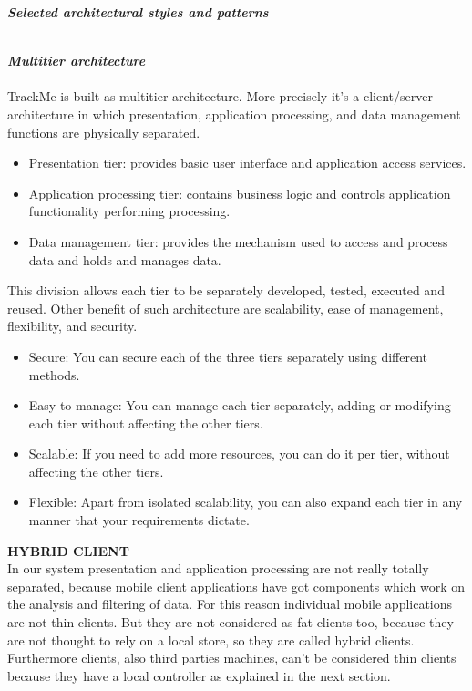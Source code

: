 \begin{legal}
\begin{legal}
				\end{legal}
		\item \textit{\textbf{Selected architectural styles and patterns}}\\\\
			\begin{legal}
				\item \textit{\textbf{Multitier architecture}}\\\\
				TrackMe is built as multitier architecture. More precisely it's a client/server architecture in which presentation, application processing, and data management functions are physically separated. 
				\begin{itemize}
					\item Presentation tier: provides basic user interface and application access services.
					\item Application processing tier: contains business logic and controls application functionality performing processing.
					\item Data management tier: provides the mechanism used to access and process data and holds and manages data.
				\end{itemize}
				 This division allows each tier to be separately developed, tested, executed and reused. Other benefit of such architecture are scalability, ease of management, flexibility, and security.
				\begin{itemize}
					\item Secure: You can secure each of the three tiers separately using different methods.
					\item Easy to manage: You can manage each tier separately, adding or modifying each tier without affecting the other tiers.
					\item Scalable: If you need to add more resources, you can do it per tier, without affecting the other tiers.
					\item Flexible: Apart from isolated scalability, you can also expand each tier in any manner that your requirements dictate.\\
				\end{itemize}
				\textbf{HYBRID CLIENT}\\
				In our system presentation and application processing are not really totally separated, because mobile client applications have got components which work on the analysis and filtering of data. For this reason individual mobile applications are not thin clients. But they are not considered as fat clients too, because they are not thought to rely on a local store, so they are called hybrid clients. Furthermore clients, also third parties machines, can't be considered thin clients because they have a local controller as explained in the next section.\\\\

\end{legal}
\end{legal}
